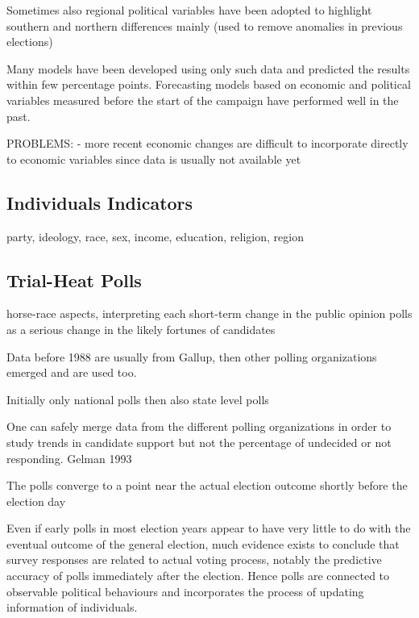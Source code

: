 \documentclass[
  12pt]{article}
\begin{document}
Sometimes also regional political variables have been adopted to
highlight southern and northern differences mainly (used to remove
anomalies in previous elections)

Many models have been developed using only such data and predicted the
results within few percentage points. Forecasting models based on
economic and political variables measured before the start of the
campaign have performed well in the past.

PROBLEMS: - more recent economic changes are difficult to incorporate
directly to economic variables since data is usually not available yet

\hypertarget{individuals-indicators}{%
\subsection{Individuals Indicators}\label{individuals-indicators}}

party, ideology, race, sex, income, education, religion, region

\hypertarget{trial-heat-polls}{%
\subsection{Trial-Heat Polls}\label{trial-heat-polls}}

horse-race aspects, interpreting each short-term change in the public
opinion polls as a serious change in the likely fortunes of candidates

Data before 1988 are usually from Gallup, then other polling
organizations emerged and are used too.

Initially only national polls then also state level polls

One can safely merge data from the different polling organizations in
order to study trends in candidate support but not the percentage of
undecided or not responding. Gelman 1993

The polls converge to a point near the actual election outcome shortly
before the election day

Even if early polls in most election years appear to have very little to
do with the eventual outcome of the general election, much evidence
exists to conclude that survey responses are related to actual voting
process, notably the predictive accuracy of polls immediately after the
election. Hence polls are connected to observable political behaviours
and incorporates the process of updating information of individuals.
\end{document}
